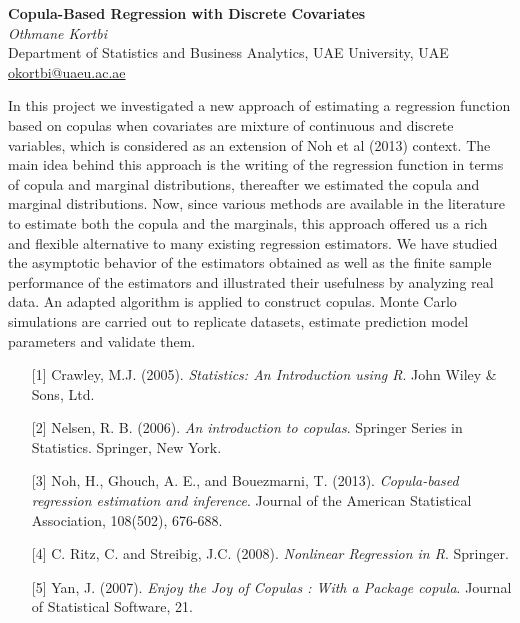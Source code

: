 \documentclass[12pt,a4paper,figuresright]{book}
\newenvironment{talk}[6]%
 {%
  \vskip 0pt\nopagebreak%
 \vskip 0pt\nopagebreak%
  \textbf{#1}\vspace{3mm}\\\nopagebreak%
  \textit{#2}\\\nopagebreak%
  #3\\\nopagebreak%
  \url{#4}\vspace{3mm}\\\nopagebreak%
  \ifthenelse{\equal{#5}{}}{}{Coauthor(s): #5\vspace{3mm}\\\nopagebreak}%
  \ifthenelse{\equal{#6}{}}{}{Special session: #6\quad \vspace{3mm}\\\nopagebreak}%
 }
 {\vspace{1cm}\\\nopagebreak}%
\begin{document}
\begin{talk}
  {Copula-Based Regression with Discrete Covariates}%
  {Othmane Kortbi}%
  {Department of Statistics and Business Analytics, UAE University, UAE}%
  {okortbi@uaeu.ac.ae}%
  {} %
  {}%

In this project we investigated a new approach of estimating a regression function
based on copulas when covariates are mixture of continuous and discrete variables,
which is considered as an extension of Noh et al (2013) context. 
The main idea behind this approach is the writing of the regression function in terms of copula and marginal distributions,
thereafter we estimated the copula and marginal distributions. Now, since various 
methods are available in the literature to estimate both the copula and the marginals, this
approach offered us a rich and 
flexible alternative to many existing regression estimators.
We have studied the asymptotic behavior of the estimators obtained as well as the finite
sample performance of the estimators and illustrated their usefulness by analyzing real
data. An adapted algorithm is applied to construct copulas. Monte Carlo simulations are carried out 
to replicate datasets, estimate prediction model parameters and validate them.
 
\medskip


\begin{enumerate}

	
	\item[{[1]}] Crawley, M.J. (2005). {\it Statistics: An Introduction using R}. John Wiley \& Sons, Ltd.
	
	\item[{[2]}]Nelsen, R. B. (2006). {\it An introduction to copulas}. Springer Series in Statistics. Springer, New York.
	
	\item[{[3]}] Noh, H., Ghouch, A. E., and Bouezmarni, T. (2013). {\it Copula-based regression estimation and inference}. Journal of the American Statistical Association, 108(502), 676-688.
	
	\item[{[4]}] C. Ritz, C. and Streibig, J.C. (2008). {\it Nonlinear Regression in R}. Springer.

\item[{[5]}] Yan, J. (2007). {\it Enjoy the Joy of Copulas : With a Package copula}. Journal of Statistical Software, 21.

\end{enumerate}

\end{talk}
\end{document}
